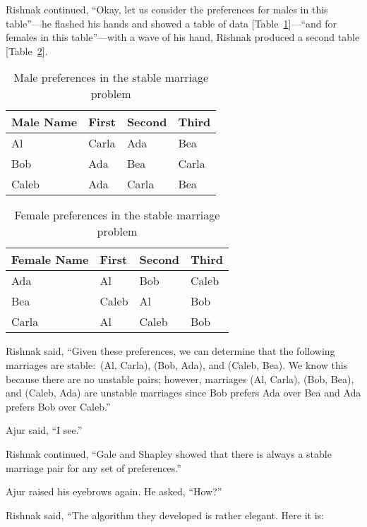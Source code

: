 Rishnak continued, ``Okay, let us consider the preferences for males in this table''---he flashed his hands and showed a table of data [Table~\ref{16t1}]---``and for females in this table''---with a wave of his hand, Rishnak produced a second table [Table~\ref{16t2}].
\begin{table}
\begin{center}
\begin{tabular}{ |p{3cm}||p{1.5cm}||p{1.5cm} || p{1.5cm}|| }
 \hline
 \hline
 Male Name & First&Second&Third\\
 \hline
 Al  & Carla    &Ada&Bea\\
Bob&Ada&Bea&Carla\\
Caleb&Ada&Carla&Bea\\
 
 
 \hline
\end{tabular}
\caption{Male preferences in the stable marriage problem}\label{16t1}
\end{center}
\end{table}
\begin{table}
\begin{center}
\begin{tabular}{ |p{3cm}||p{1.5cm}||p{1.5cm} || p{1.5cm}|| }
 \hline
 \hline
 Female Name & First&Second&Third\\
 \hline
 Ada  & Al    &Bob&Caleb\\
Bea&Caleb&Al&Bob\\
Carla&Al&Caleb&Bob\\
 
 
 \hline
\end{tabular}
\caption{Female preferences in the stable marriage problem}\label{16t2}
\end{center}
\end{table}

Rishnak said, ``Given these preferences, we can determine that the following marriages are stable:~(Al, Carla), (Bob, Ada), and (Caleb, Bea). We know this because there are no unstable pairs; however, marriages (Al, Carla), (Bob, Bea), and (Caleb, Ada) are unstable marriages since Bob prefers Ada over Bea and Ada prefers Bob over Caleb.''

Ajur said, ``I see.''

Rishnak continued, ``Gale and Shapley showed that there is always a stable marriage pair for any set of preferences.''

Ajur raised his eyebrows again.  He asked, ``How?''

Rishnak said, ``The algorithm they developed is rather elegant. Here it is:

